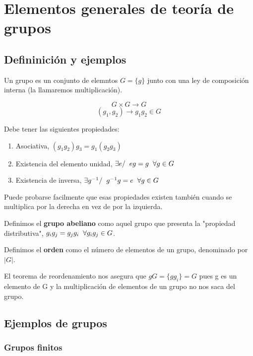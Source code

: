 
\section{Elementos generales de teoría de grupos}
\subsection{Defininición y ejemplos}
Un grupo es un conjunto de elemntos $G=\lbrace g\rbrace$ junto con una ley de composición interna (la llamaremos multiplicación).

$$G\times G\rightarrow G$$
$$(g_1,g_2)\rightarrow g_1g_2 \in G$$

Debe tener las siguientes propiedades:

\begin{enumerate}
\item Asociativa, $ (g_1g_2)g_3=g_1(g_2g_3)$
\item Existencia del elemento unidad, $\exists e / \hspace{0.2cm} eg=g\hspace{0.2cm} \forall g\in G$
\item Existencia de inversa, $\exists g^{-1} / \hspace{0.2cm} g^{-1}g=e \hspace{0.2cm} \forall g\in G$
\end{enumerate}

Puede probarse facilmente que esas propiedades existen también cuando se multiplica por la derecha en vez de por la izquierda.

\smallskip
Definimos el \textbf{grupo abeliano} como aquel grupo que presenta la "propiedad distributiva", $g_ig_j=g_jg_i \hspace{0.2cm} \forall g_ig_j \in G$.

\smallskip
Definimos el \textbf{orden} como el número de elementos de un grupo, denominado por $|G|$.

\smallskip
El teorema de reordenamiento nos asegura que $gG=\lbrace gg_i\rbrace =G$ pues g es un elemento de G y la multiplicación de elementos de un grupo no nos saca del grupo.

\subsection{Ejemplos de grupos}

\subsubsection{Grupos finitos}

